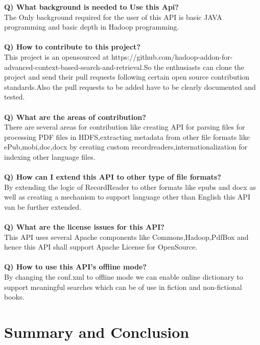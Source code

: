\documentclass[oneside,a4paper,12pt]{report}
\begin{document}
{\noindent\textbf{Q) What background is needed to Use this Api?}\\
The Only background required for the user of this API is basic JAVA programming and basic depth in Hadoop programming.\\\\

\noindent\textbf{Q) How to contribute to this project?}\\
This project is an opensourced at https://github.com/hadoop-addon-for-advanced-context-based-search-and-retrieval.So the enthusiasts can clone the project and send their pull requests following certain open source contribution standards.Also the pull requests to be added have to be clearly documented and tested.\\\\

\noindent\textbf{Q) What are the areas of contribution?}\\
There are several areas for contribution like creating API for parsing files for processing PDF files in HDFS,extracting metadata from other file formats like ePub,mobi,doc,docx by creating custom recordreaders,internationalization for indexing other language files.\\\\

\noindent\textbf{Q) How can I extend this API to other type of file formats?}\\
By extending the logic of RecordReader to other formats like epubs and docx as well as creating a mechanism to support language other than English this API van be further extended.\\\\

\noindent\textbf{Q) What are the license issues for this API?}\\
This API uses several Apache components like Commons,Hadoop,PdfBox and hence this API shall support Apache License for OpenSource.\\\\

\noindent\textbf{Q) How to use this API's offline mode?}\\
By changing the conf.xml to offline mode we can enable online dictionary to support meaningful searches which can be of use in fiction and non-fictional books.


\chapter{Summary and Conclusion}
}
\end{document}
